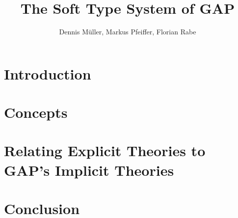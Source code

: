 \documentclass[a4paper]{article}
\begin{document}

\title{The Soft Type System of GAP}
\author{Dennis Müller, Markus Pfeiffer, Florian Rabe}
\maketitle

\begin{abstract}
  
\end{abstract}

\section{Introduction}
  

\section{Concepts}
  
  
\section{Relating Explicit Theories to GAP's Implicit Theories}
  
  
\section{Conclusion}
  




\end{document}
